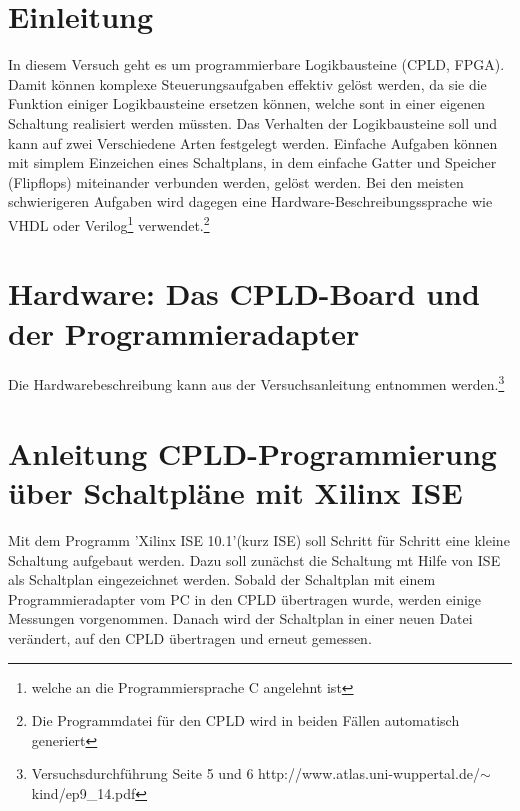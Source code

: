 \documentclass[12pt,a4paper]{article}
\begin{document}
\newpage
\tableofcontents
\newpage
\section{Einleitung}
In diesem Versuch geht es um programmierbare Logikbausteine (CPLD, FPGA). Damit können komplexe Steuerungsaufgaben effektiv gelöst werden, da sie die Funktion einiger Logikbausteine ersetzen können, welche sont in einer eigenen Schaltung realisiert werden müssten. Das Verhalten der Logikbausteine soll und kann auf zwei Verschiedene Arten festgelegt werden. Einfache Aufgaben können mit simplem Einzeichen eines Schaltplans, in dem einfache Gatter und Speicher (Flipflops) miteinander verbunden werden, gelöst werden. Bei den meisten schwierigeren Aufgaben wird dagegen eine Hardware-Beschreibungssprache wie VHDL oder Verilog\footnote{welche an die Programmiersprache C angelehnt ist} verwendet.\footnote{Die Programmdatei für den CPLD wird in beiden Fällen automatisch generiert}
\section{Hardware: Das CPLD-Board und der Programmieradapter}
Die Hardwarebeschreibung kann aus der Versuchsanleitung entnommen werden.\footnote{Versuchsdurchführung Seite 5 und 6 http://www.atlas.uni-wuppertal.de/$\sim$kind/ep9\_14.pdf}

\section{Anleitung CPLD-Programmierung über Schaltpläne mit Xilinx ISE}
Mit dem Programm 'Xilinx ISE 10.1'(kurz ISE) soll Schritt für Schritt eine kleine Schaltung aufgebaut werden. Dazu soll zunächst die Schaltung mt Hilfe von ISE als Schaltplan eingezeichnet werden. Sobald der Schaltplan mit einem Programmieradapter vom PC in den CPLD übertragen wurde, werden einige Messungen vorgenommen. Danach wird der Schaltplan in einer neuen Datei verändert, auf den CPLD übertragen und erneut gemessen. 
\end{document}
